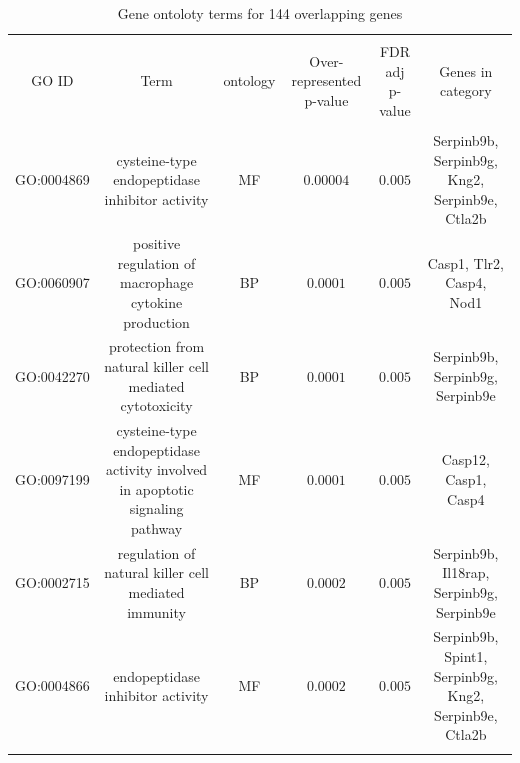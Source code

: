 
\begin{table}[!htbp] \centering 
  \caption{Gene ontoloty terms for 144 overlapping genes} 
  \label{} 
\begin{tabular}{@{\extracolsep{5pt}} cccccc} 
\\[-1.8ex]\hline 
\hline \\[-1.8ex] 
GO ID & Term & ontology & Over-represented p-value & FDR adj p-value & Genes in category \\ 
\hline \\[-1.8ex] 
GO:0004869 & cysteine-type endopeptidase inhibitor activity & MF & $0.00004$ & $0.005$ & Serpinb9b, Serpinb9g, Kng2, Serpinb9e, Ctla2b \\ 
GO:0060907 & positive regulation of macrophage cytokine production & BP & $0.0001$ & $0.005$ & Casp1, Tlr2, Casp4, Nod1 \\ 
GO:0042270 & protection from natural killer cell mediated cytotoxicity & BP & $0.0001$ & $0.005$ & Serpinb9b, Serpinb9g, Serpinb9e \\ 
GO:0097199 & cysteine-type endopeptidase activity involved in apoptotic signaling pathway & MF & $0.0001$ & $0.005$ & Casp12, Casp1, Casp4 \\ 
GO:0002715 & regulation of natural killer cell mediated immunity & BP & $0.0002$ & $0.005$ & Serpinb9b, Il18rap, Serpinb9g, Serpinb9e \\ 
GO:0004866 & endopeptidase inhibitor activity & MF & $0.0002$ & $0.005$ & Serpinb9b, Spint1, Serpinb9g, Kng2, Serpinb9e, Ctla2b \\ 
\hline \\[-1.8ex] 
\end{tabular} 
\end{table} 
